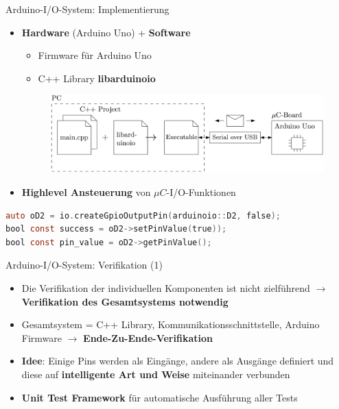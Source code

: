 \documentclass{beamer}
\begin{document}
\begin{frame}[fragile]{Arduino-I/O-System: Implementierung}
	\begin{itemize}
		\item \textbf{Hardware} (Arduino Uno) + \textbf{Software}
		\begin{itemize}
			\item Firmware f\"ur Arduino Uno
			\item C++ Library \textbf{libarduinoio}
		\end{itemize}
		\begin{figure}[htbp]
			\centering
			\includegraphics[scale=0.2]{./images/arduinoio-system-overview.png}
		\end{figure}
		\item \textbf{Highlevel Ansteuerung} von $\mu{}C$-I/O-Funktionen
	\end{itemize}
\begin{lstlisting}[frame=single, language=C]
auto oD2 = io.createGpioOutputPin(arduinoio::D2, false);
bool const success = oD2->setPinValue(true));
bool const pin_value = oD2->getPinValue();
\end{lstlisting}
\end{frame}
\begin{frame}{Arduino-I/O-System: Verifikation (1)}
	\begin{itemize}
		\item Die Verifikation der individuellen Komponenten ist nicht zielf\"uhrend $\rightarrow$ \textbf{Verifikation des Gesamtsystems notwendig}
	\end{itemize}
	\begin{itemize}
		\item Gesamtsystem = C++ Library, Kommunikationsschnittstelle, Arduino Firmware $\rightarrow$ \textbf{Ende-Zu-Ende-Verifikation}
	\end{itemize}
	\begin{itemize}
		\item \textbf{Idee}: Einige Pins werden als Eing\"ange, andere als Ausg\"ange definiert und diese auf \textbf{intelligente Art und Weise} miteinander verbunden
	\end{itemize}
	\begin{itemize}
		\item \textbf{Unit Test Framework} f\"ur automatische Ausf\"uhrung aller Tests
	\end{itemize}
\end{frame}
\end{document}
